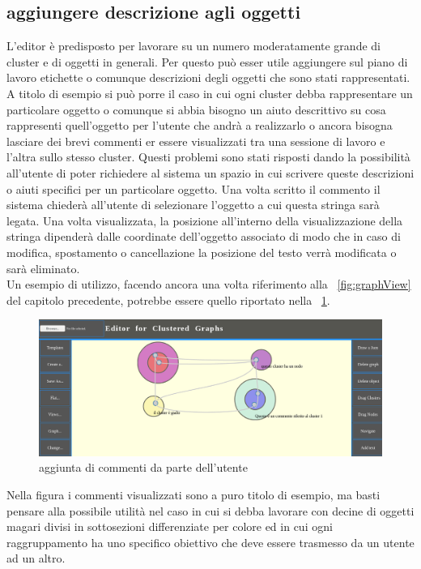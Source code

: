 {\subsection{aggiungere descrizione agli oggetti}
L'editor è predisposto per lavorare su un numero moderatamente grande di cluster e di oggetti in generali. Per questo può esser utile aggiungere sul piano di lavoro etichette o comunque descrizioni degli oggetti che sono stati rappresentati. A titolo di esempio si può porre il caso in cui ogni cluster debba rappresentare un particolare oggetto o comunque si abbia bisogno un aiuto descrittivo su cosa rappresenti quell'oggetto per l'utente che andrà a realizzarlo o ancora bisogna lasciare dei brevi commenti er essere visualizzati tra una sessione di lavoro e l'altra sullo stesso cluster. Questi problemi sono stati risposti dando la possibilità all'utente di poter richiedere al sistema un spazio in cui scrivere queste descrizioni o aiuti specifici per un particolare oggetto. Una volta scritto il commento il sistema chiederà all'utente di selezionare l'oggetto a cui questa stringa sarà legata. Una volta visualizzata, la posizione all'interno della visualizzazione della stringa dipenderà dalle coordinate dell'oggetto associato di modo che in caso di modifica, spostamento o cancellazione la posizione del testo verrà modificata o sarà eliminato.\\
Un esempio di utilizzo, facendo ancora una volta riferimento alla \figurename~\ref{fig:graphView} del capitolo precedente, potrebbe essere quello riportato nella \figurename~\ref{fig:addText}.
\begin{figure}[!htb]
	\begin{center}
		\includegraphics[width=1 \linewidth]{figure/addText}
	\end{center}
	\caption{aggiunta di commenti da parte dell'utente\label{fig:addText}}
\end{figure}
Nella figura i commenti visualizzati sono a puro titolo di esempio, ma basti pensare alla possibile utilità nel caso in cui si debba lavorare con decine di oggetti magari divisi in sottosezioni differenziate per colore ed in cui ogni raggruppamento ha uno specifico obiettivo che deve essere trasmesso da un utente ad un altro.
}
